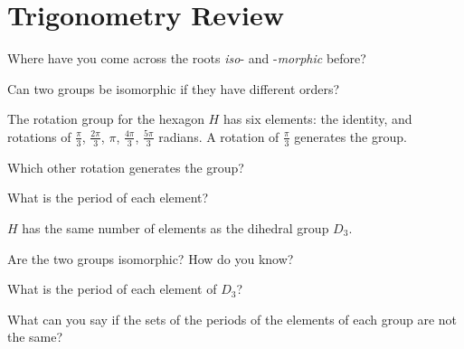 \documentclass[../gatm_answers.tex]{subfiles}
\begin{document}
\section{Trigonometry Review}

\begin{outer_problem}[start=1]
\item Where have you come across the roots \textit{iso}- and -\textit{morphic} before?
\end{outer_problem}

\begin{outer_problem}
\item Can two groups be isomorphic if they have different orders?
\end{outer_problem}

\begin{outer_problem}
\item The rotation group for the hexagon $H$ has six elements: the identity, and rotations of $\frac{\pi}{3}$, $\frac{2\pi}{3}$, $\pi$, $\frac{4\pi}{3}$, $\frac{5\pi}{3}$ radians. A rotation of $\frac{\pi}{3}$ generates the group.
\end{outer_problem}

\begin{inner_problem}[start=1]
\item Which other rotation generates the group?
\end{inner_problem}

\begin{inner_problem}
\item What is the period of each element?
\end{inner_problem}

\begin{outer_problem}
\item $H$ has the same number of elements as the dihedral group $D_3$. 
\end{outer_problem}

\begin{inner_problem}[start=1]
\item Are the two groups isomorphic? How do you know?
\end{inner_problem}

\begin{inner_problem}
\item What is the period of each element of $D_3$?
\end{inner_problem}

\begin{inner_problem}
\item What can you say if the sets of the periods of the elements of each group are not the same?
\end{inner_problem}
\end{document}
